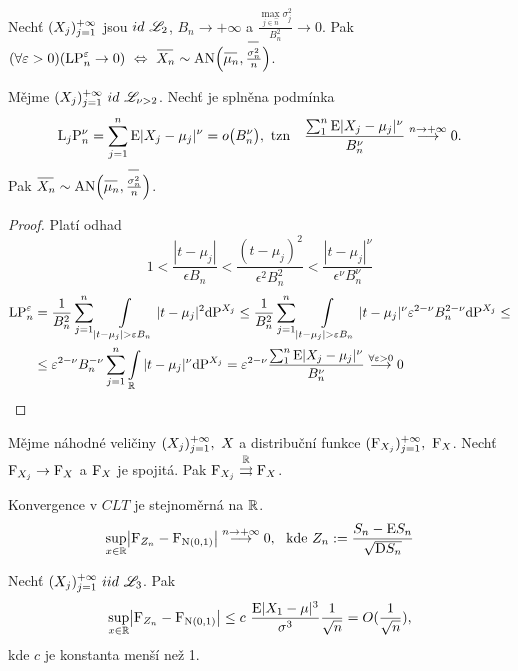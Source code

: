 \begin{remark}
	Nechť $(X_j)_{j=1}^{+\infty}$ jsou $id~\mathscr{L}_2$, $B_n\to+\infty$ a $\frac{\max\limits_{j\in\hat{n}}\sigma_j^2}{B_n^2}\to 0$. Pak\newline $(\forall\epsilon>0)(\mathrm{LP}_n^\epsilon\to 0)~\Leftrightarrow~\oxn\sim \mathrm{AN}\Br{\omn,\frac{\osn}{n}}$.
\end{remark}
\begin{theorem}
	Mějme $(X_j)_{j=1}^{+\infty}~id~\mathscr{L}_{\nu>2}$. Nechť je splněna podmínka $$\mathrm{L}_j\mathrm{P}_n^\nu=\sum\limits_{j=1}^{n} \mathrm{E}|X_j-\mu_j|^\nu=o\bigl(B_n^\nu\bigr),~\text{tzn}~~~\frac{\sum_1^n \mathrm{E}|X_j-\mu_j|^\nu}{B_n^\nu}\stackrel{n\to+\infty}{\longrightarrow}0.$$
	Pak $\oxn\sim \mathrm{AN}\Br{\omn,\frac{\osn}{n}}$.
	\begin{proof}Platí odhad
		$$ 1<\frac{|t-\mu_j|}{\epsilon B_n}<\frac{(t-\mu_j)^2}{\epsilon^2 B_n^2}<\frac{|t-\mu_j|^\nu}{\epsilon^\nu B_n^\nu} $$
		\[
		\begin{split}
		\mathrm{LP}_n^\epsilon&=\frac{1}{B_n^2}\sumjn \int\limits_{|t-\mu_j|>\epsilon B_n}|t-\mu_j|^2\dif\PP^{X_j}\leq \frac{1}{B_n^2}\sumjn \int\limits_{|t-\mu_j|>\epsilon B_n}|t-\mu_j|^\nu \epsilon^{2-\nu}B_n^{2-\nu} \dif\PP^{X_j}\leq \\ &\leq \epsilon^{2-\nu}B_n^{-\nu}\sumjn \int\limits_{\R} |t-\mu_j|^\nu \dif\PP^{X_j}=\epsilon^{2-\nu}\frac{\sum_1^n \E|X_j-\mu_j|^\nu}{B_n^\nu}\stackrel{\forall\epsilon>0}{\longrightarrow}0
		\end{split}
		\]
	\end{proof}
\end{theorem}
\begin{theorem}
	Mějme náhodné veličiny $(X_j)_{j=1}^{+\infty},~X$ a distribuční funkce $(\mathrm{F}_{X_j})_{j=1}^{+\infty},~\mathrm{F}_X$. Nechť $\mathrm{F}_{X_j}\to \mathrm{F}_X$ a $\mathrm{F}_X$ je spojitá. Pak $\mathrm{F}_{X_j}\stackrel{\mathbb{R}}{\rightrightarrows}\mathrm{F}_X$.
\end{theorem}
\begin{dusl}
	Konvergence v $CLT$ je stejnoměrná na $\mathbb{R}$.
	$$ \sup\limits_{x\in\mathbb{R}}\bigl| \mathrm{F}_{Z_n}-\mathrm{F}_{\mathrm{N}(0,1)} \bigr|\stackrel{n\to+\infty}{\longrightarrow} 0,~~\text{kde }Z_n:=\frac{S_n-\mathrm{E} S_n}{\sqrt{\mathrm{D} S_n}} $$
\end{dusl}
\begin{theorem}
	Nechť $(X_j)_{j=1}^{+\infty}~iid~\mathscr{L}_3$. Pak
	$$ \sup\limits_{x\in\mathbb{R}}\bigl| \mathrm{F}_{Z_n}-\mathrm{F}_{\mathrm{N}(0,1)} \bigr|\leq c~\frac{\mathrm{E} |X_1-\mu|^3}{\sigma^3}\frac{1}{\sqrt{n}}=O(\frac{1}{\sqrt{n}}), $$ kde $c$ je konstanta menší než 1.
\end{theorem}


